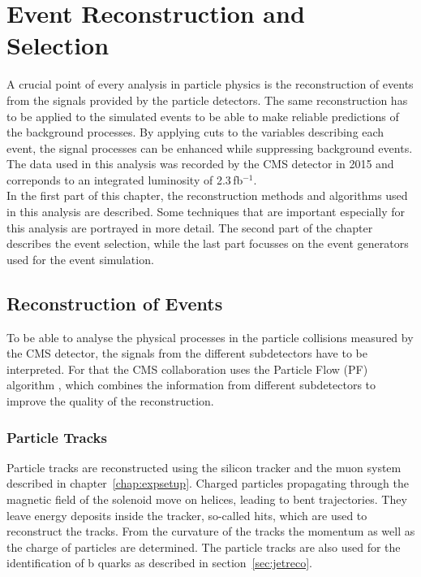 \chapter{Event Reconstruction and Selection}
\label{chap::EventReconstructionandSelection}
A crucial point of every analysis in particle physics is the reconstruction of events from the signals provided by the particle detectors. The same reconstruction has to be applied to the simulated events to be able to make reliable predictions of the background processes. By applying cuts to the variables describing each event, the signal processes can be enhanced while suppressing background events. The data used in this analysis was recorded by the CMS detector in 2015 and correponds to an integrated luminosity of 2.3\,fb$^{-1}$.\\

\noindent In the first part of this chapter, the reconstruction methods and algorithms used in this analysis are described. Some techniques that are important especially for this analysis are portrayed in more detail. The second part of the chapter describes the event selection, while the last part focusses on the event generators used for the event simulation.
\section{Reconstruction of Events}
To be able to analyse the physical processes in the particle collisions measured by the CMS detector, the signals from the different subdetectors have to be interpreted. For that the CMS collaboration uses the Particle Flow (PF) algorithm \cite{PF1,PF2}, which combines the information from different subdetectors to improve the quality of the reconstruction.
\subsection{Particle Tracks}
Particle tracks are reconstructed using the silicon tracker and the muon system described in chapter~\ref{chap:expsetup}. Charged particles propagating through the magnetic field of the solenoid move on helices, leading to bent trajectories. They leave energy deposits inside the tracker, so-called hits, which are used to reconstruct the tracks. From the curvature of the tracks the momentum as well as the charge of particles are determined. The particle tracks are also used for the identification of b quarks as described in section~\ref{sec:jetreco}.\\

